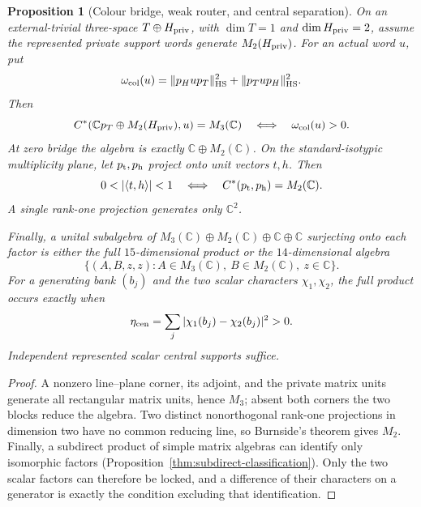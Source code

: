 \documentclass[11pt]{article}
\numberwithin{equation}{section}
\newtheorem{proposition}[theorem]{Proposition}
\theoremstyle{definition}
\theoremstyle{remark}
\newcommand{\C}{\mathbb C}
\newcommand{\HS}{\mathrm{HS}}
\begin{document}
\begin{proposition}[Colour bridge, weak router, and central separation]
\label{thm:colour-bridge}
On an external-trivial three-space $T\oplus H_{\rm priv}$, with
$\dim T=1$ and $\dim H_{\rm priv}=2$, assume the represented private support
words generate $M_2(H_{\rm priv})$.  For an actual word $u$, put
\begin{equation}
 \omega_{\rm col}(u)=\|p_Hup_T\|_{\HS}^2+\|p_Tup_H\|_{\HS}^2.
 \label{eq:colour-bridge}
\end{equation}
Then
\begin{equation}
 C^*(\C p_T\oplus M_2(H_{\rm priv}),u)=M_3(\C)
 \quad\Longleftrightarrow\quad\omega_{\rm col}(u)>0.
 \label{eq:colour-M3}
\end{equation}
At zero bridge the algebra is exactly $\C\oplus M_2(\C)$.
On the standard-isotypic multiplicity plane, let $p_{\rm t},p_{\rm h}$
project onto unit vectors $t,h$.  Then
\begin{equation}
 0<|\langle t,h\rangle|<1
 \quad\Longleftrightarrow\quad C^*(p_{\rm t},p_{\rm h})=M_2(\C).
 \label{eq:weak-M2}
\end{equation}
A single rank-one projection generates only $\C^2$.

Finally, a unital subalgebra of
$M_3(\C)\oplus M_2(\C)\oplus\C\oplus\C$ surjecting onto each factor is
either the full $15$-dimensional product or the $14$-dimensional algebra
\begin{equation}
 \{(A,B,z,z):A\in M_3(\C),\ B\in M_2(\C),\ z\in\C\}.
 \label{eq:central-locked-14}
\end{equation}
For a generating bank $(b_j)$ and the two scalar characters $\chi_1,\chi_2$,
the full product occurs exactly when
\begin{equation}
 \eta_{\rm cen}=\sum_j|\chi_1(b_j)-\chi_2(b_j)|^2>0.
 \label{eq:central-separation-margin}
\end{equation}
Independent represented scalar central supports suffice.
\end{proposition}
\begin{proof}
A nonzero line--plane corner, its adjoint, and the private matrix units
generate all rectangular matrix units, hence $M_3$; absent both corners the
two blocks reduce the algebra.  Two distinct nonorthogonal rank-one
projections in dimension two have no common reducing line, so Burnside's
theorem gives $M_2$.  Finally, a subdirect product of simple matrix algebras
can identify only isomorphic factors
(Proposition~\ref{thm:subdirect-classification}).  Only the two scalar factors
can therefore be locked, and a difference of their characters on a generator
is exactly the condition excluding that identification.
\end{proof}
\end{document}
